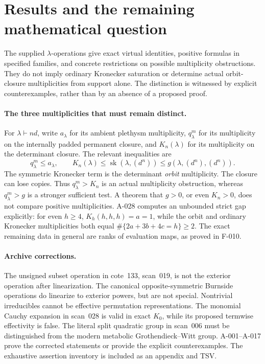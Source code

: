 \section*{Results and the remaining mathematical question}

The supplied \(\lambda\)-operations give exact virtual identities,
positive formulas in specified families, and concrete restrictions on
possible multiplicity obstructions. They do not imply ordinary
Kronecker saturation or determine actual orbit-closure multiplicities
from support alone. The distinction is witnessed by explicit
counterexamples, rather than by an absence of a proposed proof.

\paragraph{The three multiplicities that must remain distinct.}
For \(\lambda\vdash nd\), write \(a_\lambda\) for its ambient
plethysm multiplicity, \(q^m_\lambda\) for its multiplicity on the
internally padded permanent closure, and \(K_n(\lambda)\) for
its multiplicity on the determinant closure. The relevant inequalities
are
\[
 q^m_\lambda\leq a_\lambda,\qquad
 K_n(\lambda)\leq\operatorname{sk}(\lambda,(d^n))
                         \leq g(\lambda,(d^n),(d^n)).
\]
The symmetric Kronecker term is the determinant \emph{orbit}
multiplicity. The closure can lose copies. Thus \(q^m_\lambda>K_n\)
is an actual multiplicity obstruction, whereas \(q^m_\lambda>g\)
is a stronger sufficient test. A theorem that \(g>0\), or even
\(K_n>0\), does not compare positive multiplicities. A-028 computes an unbounded strict gap explicitly: for even \(h\geq4\),
\(K_h(h,h,h)=a=1\), while the orbit and ordinary Kronecker
multiplicities both equal \(\#\{2a+3b+4c=h\}\geq2\).
The exact remaining data in general are ranks of evaluation maps,
as proved in F-010.

\paragraph{Archive corrections.}
The unsigned subset operation in cote~133, scan~019, is not the
exterior operation after linearization. The canonical opposite-symmetric
Burnside operations do linearize to exterior powers, but are not
special. Nontrivial irreducibles cannot be effective permutation
representations. The monomial Cauchy expansion in scan~028 is valid
in exact \(K_0\), while its proposed termwise effectivity is false.
The literal split quadratic group in scan~006 must be distinguished
from the modern metabolic Grothendieck--Witt group. A-001--A-017
prove the corrected statements or provide the explicit counterexamples.
The exhaustive assertion inventory is included as an appendix and TSV.


